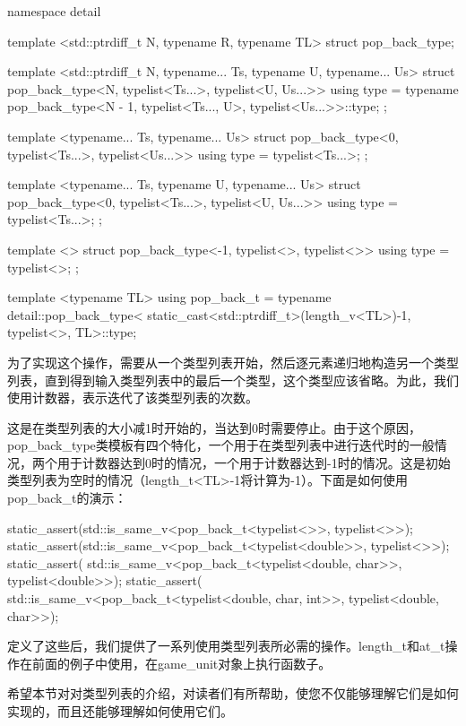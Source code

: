 \begin{cpp}
namespace detail
{
	template <std::ptrdiff_t N, typename R, typename TL>
	struct pop_back_type;
	
	template <std::ptrdiff_t N, typename... Ts,
			  typename U, typename... Us>
	struct pop_back_type<N, typelist<Ts...>,
							typelist<U, Us...>>
	{
		using type =
			typename pop_back_type<N - 1,
									typelist<Ts..., U>,
									typelist<Us...>>::type;
	};

	template <typename... Ts, typename... Us>
	struct pop_back_type<0, typelist<Ts...>,
							typelist<Us...>>
	{
		using type = typelist<Ts...>;
	};

	template <typename... Ts, typename U, typename... Us>
	struct pop_back_type<0, typelist<Ts...>,
							typelist<U, Us...>>
	{
		using type = typelist<Ts...>;
	};

	template <>
	struct pop_back_type<-1, typelist<>, typelist<>>
	{
		using type = typelist<>;
	};
}

template <typename TL>
using pop_back_t = typename detail::pop_back_type<
	static_cast<std::ptrdiff_t>(length_v<TL>)-1,
				typelist<>, TL>::type;
\end{cpp}

为了实现这个操作，需要从一个类型列表开始，然后逐元素递归地构造另一个类型列表，直到得到输入类型列表中的最后一个类型，这个类型应该省略。为此，我们使用计数器，表示迭代了该类型列表的次数。

这是在类型列表的大小减1时开始的，当达到0时需要停止。由于这个原因，pop\_back\_type类模板有四个特化，一个用于在类型列表中进行迭代时的一般情况，两个用于计数器达到0时的情况，一个用于计数器达到-1时的情况。这是初始类型列表为空时的情况（length\_t<TL>-1将计算为-1）。下面是如何使用pop\_back\_t的演示：

\begin{cpp}
static_assert(std::is_same_v<pop_back_t<typelist<>>,
							 typelist<>>);
static_assert(std::is_same_v<pop_back_t<typelist<double>>,
							 typelist<>>);
static_assert(
	std::is_same_v<pop_back_t<typelist<double, char>>,
							  typelist<double>>);
static_assert(
	std::is_same_v<pop_back_t<typelist<double, char, int>>,
							  typelist<double, char>>);
\end{cpp}

定义了这些后，我们提供了一系列使用类型列表所必需的操作。length\_t和at\_t操作在前面的例子中使用，在game\_unit对象上执行函数子。

希望本节对对类型列表的介绍，对读者们有所帮助，使您不仅能够理解它们是如何实现的，而且还能够理解如何使用它们。



















